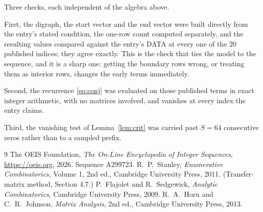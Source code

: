 \documentclass[11pt,a4paper]{article}
\theoremstyle{plain}
\theoremstyle{definition}
\begin{document}
Three checks, each independent of the algebra above.

First, the digraph, the start vector and the end vector were built directly from the
entry's stated condition, the one-row count computed separately, and the resulting values
compared against the entry's DATA at every one of the $20$ published indices; they
agree exactly. This is the check that ties the model to the sequence, and it is a sharp one:
getting the boundary rows wrong, or treating them as interior rows, changes the early terms
immediately.

Second, the recurrence \eqref{eq:conj} was evaluated on those published terms in exact
integer arithmetic, with no matrices involved, and vanishes at every index the entry claims.

Third, the vanishing test of Lemma~\ref{lem:crit} was carried past $S=64$ consecutive
zeros rather than to a sampled prefix.

\begin{thebibliography}{9}
 The OEIS Foundation, \emph{The On-Line Encyclopedia of Integer
Sequences}, \url{https://oeis.org}, 2026. Sequence A299723.
 R.~P.~Stanley, \emph{Enumerative Combinatorics}, Volume 1, 2nd ed.,
Cambridge University Press, 2011. (Transfer-matrix method, Section 4.7.)
 P.~Flajolet and R.~Sedgewick, \emph{Analytic Combinatorics}, Cambridge
University Press, 2009.
 R.~A.~Horn and C.~R.~Johnson, \emph{Matrix Analysis}, 2nd ed., Cambridge
University Press, 2013.
\end{thebibliography}
\end{document}
